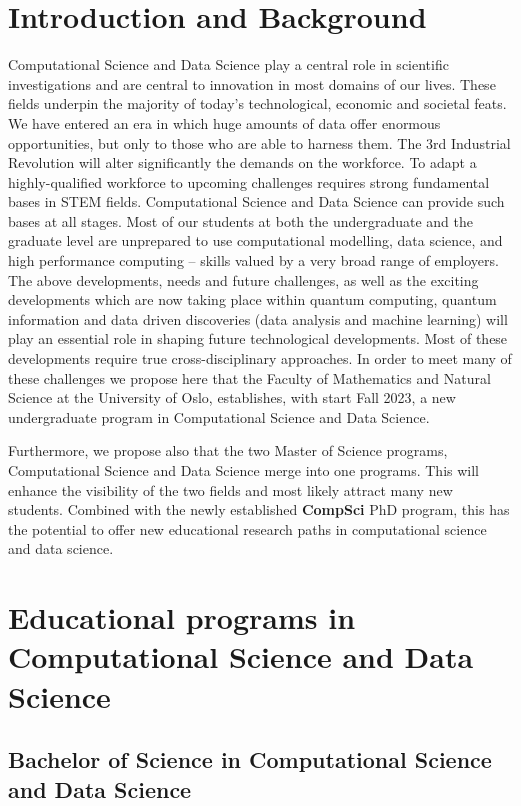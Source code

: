 \documentclass[oneside,final,10pt]{article}
\begin{document}
\section*{Introduction and Background}

Computational Science and Data Science play a central role in scientific investigations and are central to innovation in most domains of our lives. These fields underpin the majority of today's technological, economic and societal feats. We have entered an era in which huge amounts of data offer enormous opportunities, but only to those who are able to harness them. The 3rd Industrial Revolution will alter significantly the demands on the workforce. To adapt a highly-qualified workforce to upcoming challenges requires strong fundamental bases in STEM fields. Computational Science and Data Science can provide such bases at all stages. Most of our students at both the undergraduate and the graduate level are unprepared to use computational modelling, data science, and high performance computing – skills valued by a very broad range of employers. 
The above developments, needs and future challenges, as well as the exciting developments which are now taking place within quantum computing, quantum information and data driven discoveries (data analysis and machine learning) will play an essential role in shaping future technological developments. Most of these developments require true cross-disciplinary approaches.  In order to meet many of these challenges we propose here that the Faculty of Mathematics and Natural Science at the University of Oslo, establishes, with start Fall 2023, a new undergraduate program in Computational Science and Data Science.

Furthermore, we propose also that the two Master of Science programs, Computational Science and Data Science merge into one programs. This will enhance the visibility of the two fields and most likely attract many new students. Combined with the newly established {\bf CompSci} PhD program, this has the potential to offer new educational research paths in computational science and data science. 


\section*{Educational programs in Computational Science and Data Science}


\subsection*{Bachelor of Science in Computational Science and Data Science}
\end{document}
